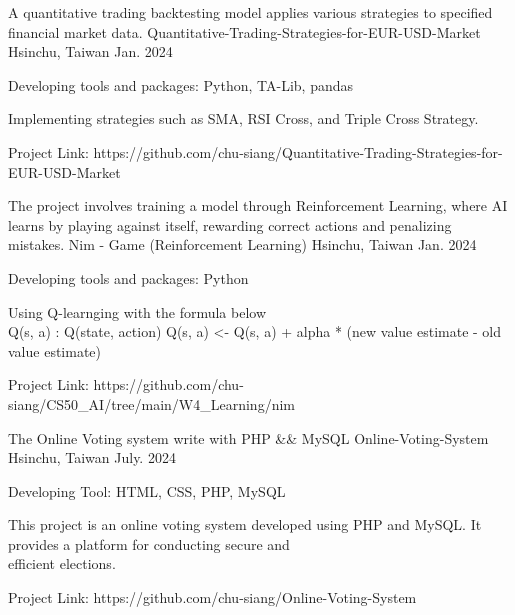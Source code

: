 \begin{cventries}
  \cventry
    {A quantitative trading backtesting model applies various strategies to specified financial market data.} %
    {Quantitative-Trading-Strategies-for-EUR-USD-Market} %
    {Hsinchu, Taiwan} %
    {Jan. 2024} %
    {
      \begin{cvitems} %
        \item {Developing tools and packages: Python, TA-Lib, pandas}
        \item {Implementing strategies such as SMA, RSI Cross, and Triple Cross Strategy.}
        \item {Project Link: https://github.com/chu-siang/Quantitative-Trading-Strategies-for-EUR-USD-Market}
      \end{cvitems}
    }


\cventry
{The project involves training a model through Reinforcement Learning, where AI learns by playing against itself, rewarding correct actions and penalizing mistakes.} %
{Nim - Game (Reinforcement Learning)} %
{Hsinchu, Taiwan} %
{Jan. 2024} %
{
  \begin{cvitems} %
    \item {Developing tools and packages: Python}
    \item {Using Q-learnging with the formula below  \\ Q(s, a) : Q(state, action) Q(s, a) <- Q(s, a) + alpha * (new value estimate - old value estimate)}
    \item {Project Link: https://github.com/chu-siang/CS50\_AI/tree/main/W4\_Learning/nim}
  \end{cvitems}
}



\cventry
{The Online Voting system write with PHP \&\& MySQL} 
{Online-Voting-System} 
{Hsinchu, Taiwan} 
{July. 2024}
{
  \begin{cvitems} %
    \item {Developing Tool: HTML, CSS, PHP, MySQL}
    \item {This project is an online voting system developed using PHP and MySQL. It provides a platform for conducting secure and \\efficient elections.}
    \item {Project Link: https://github.com/chu-siang/Online-Voting-System}
  \end{cvitems}
}

\end{cventries}